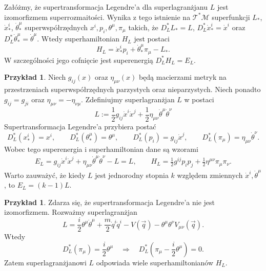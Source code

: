 \documentclass[11pt,a4paper]{report}
\theoremstyle{definition}
\newtheorem{example}[theorem]{Przykład}
\begin{document}
Załóżmy, że supertransformacja Legendre'a dla superlagranżjanu $L$ jest izomorfizmem superrozmaitości. Wynika z tego istnienie na $\mathcal{T^*M}$ superfunkcji $L_*$, $\dot x^i_*$, $\dot \theta^\mu_*$ superwspółrzędnych ${x}^i, {p}_i, {\theta}^\mu, {\pi}_\mu$ takich, że $D^*_L L_* = L$, $D^*_L \dot x^i_* = \dot x^i$ oraz $D^*_L \dot \theta^\mu_* = \dot \theta^\mu$. Wtedy superhamiltonian $H_L$ jest postaci
\begin{equation*}
	H_L = \dot x^i _* p_i + \dot \theta^\mu _* \pi_\mu - L_*.
\end{equation*}
W szczególności jego cofnięcie jest superenergią $D^*_L H_L = E_L$.
			      				
\begin{example}
	Niech $g_{ij}(x)$ oraz $\eta_{\mu \nu}(x)$ będą macierzami metryk na przestrzeniach superwspółrzędnych parzystych oraz nieparzystych. Niech ponadto $g_{ij} = g_{ji}$ oraz $\eta_{\mu \nu} = - \eta_{\nu \mu}$. Zdefiniujmy superlagranżjan $L$ w postaci
	\begin{equation*}
		L:= \frac12 g_{ij} \dot x^i \dot x^j + \frac12 \eta_{\mu \nu} \dot \theta^\mu \dot \theta^\nu 
	\end{equation*}
	Supertransformacja Legendre'a przybiera postać
	\begin{equation*}
		D^*_L(x^i_*) = x^i, \qquad D^*_L (\theta^\mu_*) = \theta^\mu, \qquad D^*_L(p_i) = g_{ij} \dot x^j, \qquad D^*_L(\pi_\mu) = \eta_{\mu \nu} \dot \theta^\nu.
	\end{equation*}
	Wobec tego superenergia i superhamiltonian dane są wzorami
	\begin{equation*}
		\begin{gathered}
			E_L = g_{ij} \dot x^i \dot x^j + \eta_{\mu \nu} \dot \theta^\mu \dot \theta^\nu - L = L, \qquad
			H_L = \frac12 g^{ij} p_i p_j + \frac12 \eta^{\mu \nu} \pi_\mu \pi_\nu.
		\end{gathered}
	\end{equation*}
	Warto zauważyć, że kiedy $L$ jest jednorodny stopnia $k$ względem zmiennych $\dot x^i, \dot \theta^\mu$, to $E_L = (k-1)L$.
\end{example}
			      				
\begin{example}
	\label{ex:irregular_legendre}
	Zdarza się, że supertransformacja Legendre'a nie jest izomorfizmem. Rozważmy superlagranżjan
	\begin{equation*}
		L = \frac{i}{2} \theta^\mu \dot{\theta}^\mu + \frac{m}{2} \dot{q}^i \dot{q}^i   - V(\overrightarrow{q}) - \theta^\mu \theta^\nu V_{\mu \nu} (\overrightarrow{q}).
	\end{equation*}
	Wtedy
	\begin{equation*}
		D^*_L (\pi_\mu) = \frac{i}{2} \theta^\mu \quad \Rightarrow \quad D^*_L (\pi_\mu - \frac{i}{2} \theta^\mu) = 0.
	\end{equation*}
	Zatem superlagranżjanowi $L$ odpowiada wiele superhamiltonianów $H_L$.
\end{example}
			      				
\end{document}
